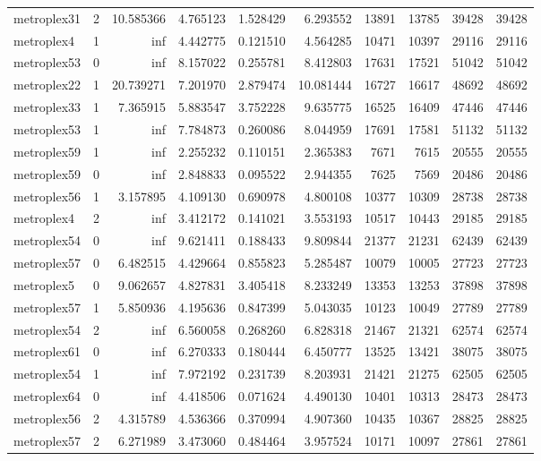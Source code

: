 \begin{longtable}{|l|r|r|r|r|r|r|r|r|r|}
metroplex31 & 2 & 10.585366 & 4.765123 & 1.528429 & 6.293552 & 13891 & 13785 & 39428 & 39428 \\
metroplex4 & 1 & inf & 4.442775 & 0.121510 & 4.564285 & 10471 & 10397 & 29116 & 29116 \\
metroplex53 & 0 & inf & 8.157022 & 0.255781 & 8.412803 & 17631 & 17521 & 51042 & 51042 \\
metroplex22 & 1 & 20.739271 & 7.201970 & 2.879474 & 10.081444 & 16727 & 16617 & 48692 & 48692 \\
metroplex33 & 1 & 7.365915 & 5.883547 & 3.752228 & 9.635775 & 16525 & 16409 & 47446 & 47446 \\
metroplex53 & 1 & inf & 7.784873 & 0.260086 & 8.044959 & 17691 & 17581 & 51132 & 51132 \\
metroplex59 & 1 & inf & 2.255232 & 0.110151 & 2.365383 & 7671 & 7615 & 20555 & 20555 \\
metroplex59 & 0 & inf & 2.848833 & 0.095522 & 2.944355 & 7625 & 7569 & 20486 & 20486 \\
metroplex56 & 1 & 3.157895 & 4.109130 & 0.690978 & 4.800108 & 10377 & 10309 & 28738 & 28738 \\
metroplex4 & 2 & inf & 3.412172 & 0.141021 & 3.553193 & 10517 & 10443 & 29185 & 29185 \\
metroplex54 & 0 & inf & 9.621411 & 0.188433 & 9.809844 & 21377 & 21231 & 62439 & 62439 \\
metroplex57 & 0 & 6.482515 & 4.429664 & 0.855823 & 5.285487 & 10079 & 10005 & 27723 & 27723 \\
metroplex5 & 0 & 9.062657 & 4.827831 & 3.405418 & 8.233249 & 13353 & 13253 & 37898 & 37898 \\
metroplex57 & 1 & 5.850936 & 4.195636 & 0.847399 & 5.043035 & 10123 & 10049 & 27789 & 27789 \\
metroplex54 & 2 & inf & 6.560058 & 0.268260 & 6.828318 & 21467 & 21321 & 62574 & 62574 \\
metroplex61 & 0 & inf & 6.270333 & 0.180444 & 6.450777 & 13525 & 13421 & 38075 & 38075 \\
metroplex54 & 1 & inf & 7.972192 & 0.231739 & 8.203931 & 21421 & 21275 & 62505 & 62505 \\
metroplex64 & 0 & inf & 4.418506 & 0.071624 & 4.490130 & 10401 & 10313 & 28473 & 28473 \\
metroplex56 & 2 & 4.315789 & 4.536366 & 0.370994 & 4.907360 & 10435 & 10367 & 28825 & 28825 \\
metroplex57 & 2 & 6.271989 & 3.473060 & 0.484464 & 3.957524 & 10171 & 10097 & 27861 & 27861 \\

\end{longtable}
